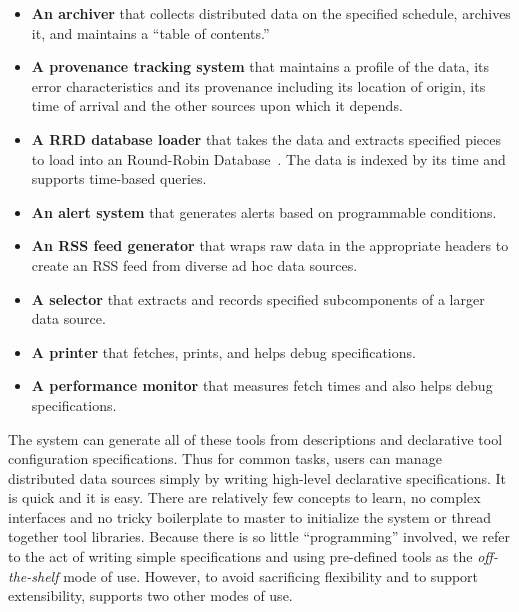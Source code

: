\begin{itemize}
\item {\bf An archiver} that collects distributed data on the specified 
schedule, archives it, and maintains a ``table of contents.''
\item {\bf A provenance tracking system} that maintains a profile of the 
data, its error characteristics and its provenance including its location of
origin, its time of arrival and the other sources upon which it depends.  
\item {\bf A RRD database loader} that takes the data and extracts specified 
pieces to load into an Round-Robin Database~\cite{rrdtool}.  The data is 
indexed by its time and supports time-based queries.  
\item {\bf An alert system} that generates alerts based on programmable 
conditions.
\item {\bf An RSS feed generator} that wraps raw data in the appropriate 
headers to create an RSS feed from diverse ad hoc data sources.
\item {\bf A selector} that extracts and records specified 
subcomponents of a larger data source.
\item {\bf A printer} that fetches, prints, and helps debug
specifications.
\item {\bf A performance monitor} that measures fetch times and also helps
debug specifications.
\end{itemize}

The system can generate all of these tools from \padsd{} descriptions
and declarative tool configuration specifications.  Thus for common
tasks, users can manage distributed data sources simply by writing
high-level declarative specifications.  It is quick and it is easy. There
are relatively few concepts to learn, no complex interfaces and no
tricky boilerplate to master to initialize 
the system or thread together tool libraries.  Because there is
so little ``programming'' involved, we refer to the act 
of writing simple specifications
and using pre-defined tools as the {\em off-the-shelf} 
mode of use.  However, to avoid sacrificing flexibility and to support extensibility,
\padsd{} supports two other modes of use.

